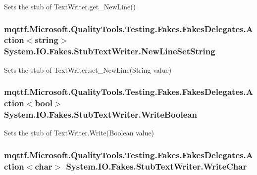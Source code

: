 Sets the stub of Text\-Writer.\-get\-\_\-\-New\-Line()

\hypertarget{class_system_1_1_i_o_1_1_fakes_1_1_stub_text_writer_aa9f304cff570080d246c029197fc800c}{
\subsubsection[{New\-Line\-Set\-String}]{\setlength{\rightskip}{0pt plus 5cm}mqttf.\-Microsoft.\-Quality\-Tools.\-Testing.\-Fakes.\-Fakes\-Delegates.\-Action$<$string$>$ System.\-I\-O.\-Fakes.\-Stub\-Text\-Writer.\-New\-Line\-Set\-String}}\label{class_system_1_1_i_o_1_1_fakes_1_1_stub_text_writer_aa9f304cff570080d246c029197fc800c}


Sets the stub of Text\-Writer.\-set\-\_\-\-New\-Line(\-String value)

\hypertarget{class_system_1_1_i_o_1_1_fakes_1_1_stub_text_writer_a58841fdc7b85161c7975c89edbf8dd3f}{
\subsubsection[{Write\-Boolean}]{\setlength{\rightskip}{0pt plus 5cm}mqttf.\-Microsoft.\-Quality\-Tools.\-Testing.\-Fakes.\-Fakes\-Delegates.\-Action$<$bool$>$ System.\-I\-O.\-Fakes.\-Stub\-Text\-Writer.\-Write\-Boolean}}\label{class_system_1_1_i_o_1_1_fakes_1_1_stub_text_writer_a58841fdc7b85161c7975c89edbf8dd3f}


Sets the stub of Text\-Writer.\-Write(\-Boolean value)

\hypertarget{class_system_1_1_i_o_1_1_fakes_1_1_stub_text_writer_a4cc9d68d356c54a195e6263114a63837}{
\subsubsection[{Write\-Char}]{\setlength{\rightskip}{0pt plus 5cm}mqttf.\-Microsoft.\-Quality\-Tools.\-Testing.\-Fakes.\-Fakes\-Delegates.\-Action$<$char$>$ System.\-I\-O.\-Fakes.\-Stub\-Text\-Writer.\-Write\-Char}}\label{class_system_1_1_i_o_1_1_fakes_1_1_stub_text_writer_a4cc9d68d356c54a195e6263114a63837}


